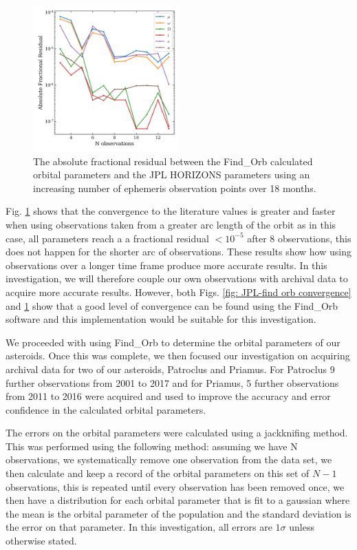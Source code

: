 \documentclass[10pt, twocolumn]{revtex4}    %
\begin{document}
\begin{figure}[h!]
\centering
\includegraphics[width=0.5\textwidth]{20180331_162447_JPL_FINDORB_CONVERGENCE2yr}
\caption{The absolute fractional residual between the Find\_Orb calculated orbital parameters and the JPL HORIZONS parameters using an increasing number of ephemeris observation points over 18 months.}
\label{fig: JPL-find orb convergence 18mth}
\end{figure}

Fig. \ref{fig: JPL-find orb convergence 18mth} shows that the convergence to the literature values is greater and faster when using observations taken from a greater arc length of the orbit as in this case, all parameters reach a a fractional residual $<10^{-5}$ after 8 observations, this does not happen for the shorter arc of observations. These results show how using observations over a longer time frame produce more accurate results. In this investigation, we will therefore couple our own observations with archival data to acquire more accurate results. However, both Figs. \ref{fig: JPL-find orb convergence} and \ref{fig: JPL-find orb convergence 18mth} show that a good level of convergence can be found using the Find\_Orb software and this implementation would be suitable for this investigation.

We proceeded with using Find\_Orb to determine the orbital parameters of our asteroids. Once this was complete, we then focused our investigation on acquiring archival data for two of our asteroids, Patroclus and Priamus. For Patroclus 9 further observations from 2001 to 2017 and for Priamus, 5 further observations from 2011 to 2016 were acquired and used to improve the accuracy and error confidence in the calculated orbital parameters.

The errors on the orbital parameters were calculated using a jackknifing method. This was performed using the following method: assuming we have N observations, we systematically remove one observation from the data set, we then calculate and keep a record of the orbital parameters on this set of $N-1$ observations, this is repeated until every observation has been removed once, we then have  a distribution for each orbital parameter that is fit to a gaussian where the mean is the orbital parameter of the population and the standard deviation is the error on that parameter. In this investigation, all errors are $1\sigma$ unless otherwise stated.
\end{document}
